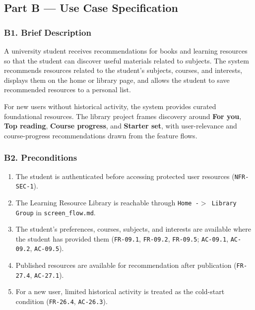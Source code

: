 \documentclass[12pt]{article}
\begin{document}
\hypertarget{sec:part-b-use-case-specification}{}
\subsection*{Part B --- Use Case Specification}
\par\medskip

\hypertarget{sec:b1-brief-description}{}
\subsubsection*{B1. Brief Description}
\par\medskip

A university student receives recommendations for books and learning resources so that the student can discover useful materials related to subjects. The system recommends resources related to the student's subjects, courses, and interests, displays them on the home or library page, and allows the student to save recommended resources to a personal list.
\par\medskip

For new users without historical activity, the system provides curated foundational resources. The library project frames discovery around \textbf{For you}, \textbf{Top reading}, \textbf{Course progress}, and \textbf{Starter set}, with user-relevance and course-progress recommendations drawn from the feature flows.
\par\medskip

\hypertarget{sec:b2-preconditions}{}
\subsubsection*{B2. Preconditions}
\par\medskip

\begin{enumerate}
\item The student is authenticated before accessing protected user resources (\texttt{NFR-SEC-1}).
\item The Learning Resource Library is reachable through \texttt{Home -$>$ Library Group} in \texttt{screen\_flow.md}.
\item The student's preferences, courses, subjects, and interests are available where the student has provided them (\texttt{FR-09.1}, \texttt{FR-09.2}, \texttt{FR-09.5}; \texttt{AC-09.1}, \texttt{AC-09.2}, \texttt{AC-09.5}).
\item Published resources are available for recommendation after publication (\texttt{FR-27.4}, \texttt{AC-27.1}).
\item For a new user, limited historical activity is treated as the cold-start condition (\texttt{FR-26.4}, \texttt{AC-26.3}).
\end{enumerate}
\par\medskip
\end{document}
